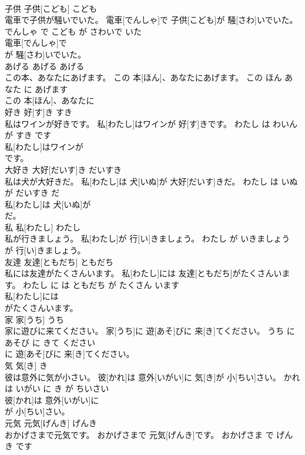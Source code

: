 \documentclass[8pt]{extreport}
\begin{document}
\begin{CJK}{UTF8}{min}
\\	子供	子供[こども]	こども	
\\	電車で子供が騒いでいた。	電車[でんしゃ]で 子供[こども]が 騒[さわ]いでいた。	でんしゃ で こども が さわいで いた	
\\	電車[でんしゃ]で
\\	が 騒[さわ]いでいた。			
\\	あげる	あげる	あげる	
\\	この本、あなたにあげます。	この 本[ほん]、あなたにあげます。	この ほん あなた に あげます	
\\	この 本[ほん]、あなたに
\\	好き	好[す]き	すき	
\\	私はワインが好きです。	私[わたし]はワインが 好[す]きです。	わたし は わいん が すき です	
\\	私[わたし]はワインが
\\	です。			
\\	大好き	大好[だいす]き	だいすき	
\\	私は犬が大好きだ。	私[わたし]は 犬[いぬ]が 大好[だいす]きだ。	わたし は いぬ が だいすき だ	
\\	私[わたし]は 犬[いぬ]が
\\	だ。			
\\	私	私[わたし]	わたし	
\\	私が行きましょう。	私[わたし]が 行[い]きましょう。	わたし が いきましょう	
\\	が 行[い]きましょう。			
\\	友達	友達[ともだち]	ともだち	
\\	私には友達がたくさんいます。	私[わたし]には 友達[ともだち]がたくさんいます。	わたし に は ともだち が たくさん います	
\\	私[わたし]には
\\	がたくさんいます。			
\\	家	家[うち]	うち	
\\	家に遊びに来てください。	家[うち]に 遊[あそ]びに 来[き]てください。	うち に あそび に きて ください	
\\	に 遊[あそ]びに 来[き]てください。			
\\	気	気[き]	き	
\\	彼は意外に気が小さい。	彼[かれ]は 意外[いがい]に 気[き]が 小[ちい]さい。	かれ は いがい に き が ちいさい	
\\	彼[かれ]は 意外[いがい]に
\\	が 小[ちい]さい。			
\\	元気	元気[げんき]	げんき	
\\	おかげさまで元気です。	おかげさまで 元気[げんき]です。	おかげさま で げんき です	

\end{CJK}
\end{document}
